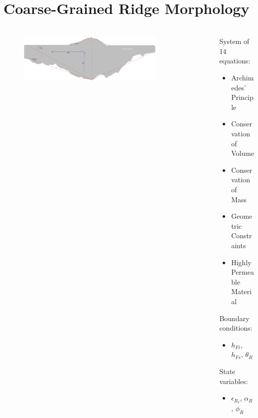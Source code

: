 \documentclass[aspectratio=169,11pt]{beamer}
\begin{document}

\section{Coarse-Grained Ridge Morphology}

\begin{frame}
\frametitle{\insertsection}
\begin{columns}[T] %
\begin{column}{.48\textwidth}
\begin{figure}[ht]
\noindent\centerline{\includegraphics[width=0.8\textwidth,height=\textheight,keepaspectratio]{Figures/Friction_Model_Diagram.eps}}
\end{figure}
\end{column}%
\begin{column}{.48\textwidth}
\begin{minipage}[c][0.9\textheight][c]{\linewidth}
System of 14 equations:
\begin{itemize}
	\item Archimedes' Principle
	\item Conservation of Volume
	\item Conservation of Mass
	\item Geometric Constraints
	\item Highly Permeable Material
\end{itemize}
Boundary conditions: 
\begin{itemize}
	\item $h_{Fi}$, $h_{Fs}$, $\theta_R$
\end{itemize}
State variables:  
\begin{itemize}
	\item $\epsilon_{R_I}$, $\alpha_R$, $\phi_R$
\end{itemize}
\end{minipage}
\end{column}%
\end{columns}
\end{frame}
\end{document}
